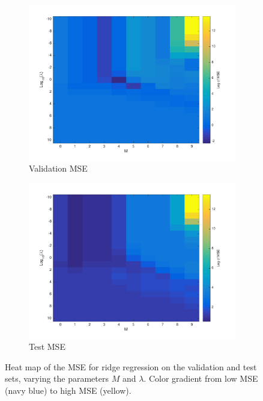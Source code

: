 \begin{figure}[htbp]
    \begin{subfigure}[b]{0.4\textwidth}
	\includegraphics[scale=0.5]{hw1_3_2.pdf}
	\caption{Validation MSE}
    \end{subfigure}
    \quad\quad\quad\quad\quad\quad
    \begin{subfigure}[b]{0.4\textwidth}
	\includegraphics[scale=0.5]{hw1_3_2b.pdf}
	\caption{Test MSE}
    \end{subfigure}
\caption{Heat map of the MSE for ridge regression on the validation and test sets, varying the parameters $M$ and $\lambda$.  Color gradient from low MSE (navy blue) to high MSE (yellow).} \label{fig:heat_map}
\end{figure}

